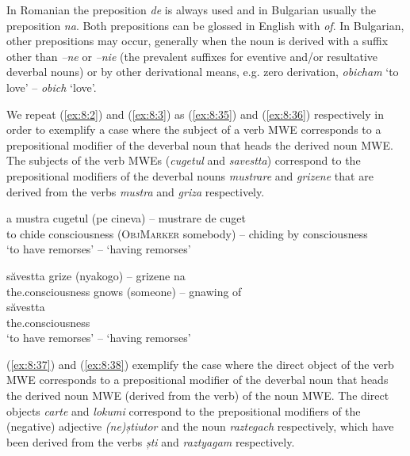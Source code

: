 \documentclass[output=paper]{langsci/langscibook}
\begin{document}
In Romanian the preposition \textit{de} is always used and in Bulgarian usually
the preposition \textit{na}. Both prepositions can be glossed in English with
\textit{of}. In Bulgarian, other prepositions may occur, generally when the
noun is derived with a suffix other than \textit{–ne} or \textit{–nie} (the prevalent
suffixes for eventive and/or resultative deverbal nouns) or by other
derivational means, e.g. zero derivation, \textit{obicham} ‘to love’ –
\textit{obich} `love'. 



We repeat (\ref{ex:8:2}) and (\ref{ex:8:3}) as (\ref{ex:8:35}) and (\ref{ex:8:36}) respectively in order to
exemplify a case where the subject of a verb MWE corresponds to a
prepositional modifier of the deverbal noun that heads the derived noun
MWE. The subjects of the verb MWEs (\textit{cugetul} and \textit{savestta})
correspond to the prepositional modifiers of the deverbal nouns
\textit{mustrare} and \textit{grizene} that are derived from the verbs \textit{mustra} and
\textit{griza} respectively.


\begin{exe}
\ex \label{ex:8:35}
\settowidth{}
\gll a mustra cugetul (pe cineva) – mustrare de cuget \\ 
to chide  consciousness  (\textsc{ObjMarker} somebody) – 
chiding by consciousness \\ 
\glt ‘to have remorses’ – ‘having remorses’
\end{exe}


\begin{exe}
\ex \label{ex:8:36}
\settowidth{}
\gll săvestta grize (nyakogo) – grizene na \\ 
the.consciousness gnows (someone) –   gnawing of \\
săvestta \\the.consciousness \\
\glt ‘to have remorses’ – ‘having remorses’
\end{exe}


(\ref{ex:8:37}) and (\ref{ex:8:38}) exemplify the case where the direct object of the verb MWE
corresponds to a prepositional modifier of the deverbal noun that heads
the derived noun MWE (derived from the verb) of the noun MWE. The
direct objects \textit{carte} and \textit{lokumi} correspond to the prepositional
modifiers of the (negative) adjective \textit{(ne)știutor} and the noun
\textit{raztegach} respectively, which have been derived from the verbs \textit{ști}
and \textit{raztyagam} respectively.
\end{document}
